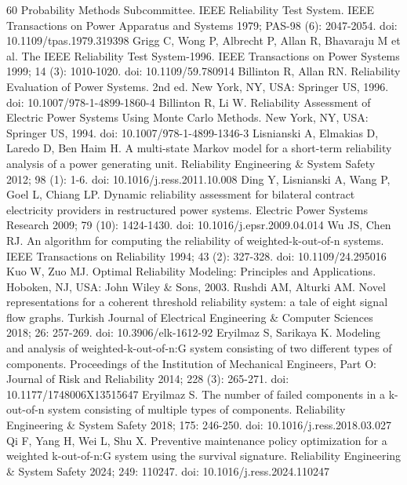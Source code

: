 \documentclass{elektr}
\begin{document}
\begin{thebibliography}{60}\footnotesize
\setlength{\itemsep}{0pt}
\setlength{\parsep}{0pt}
\setlength{\parskip}{0pt}
 Probability Methods Subcommittee. IEEE Reliability Test System. IEEE Transactions on Power Apparatus and Systems 1979; PAS-98 (6): 2047-2054. doi: 10.1109/tpas.1979.319398
 Grigg C, Wong P, Albrecht P, Allan R, Bhavaraju M et al. The IEEE Reliability Test System-1996. IEEE Transactions on Power Systems 1999; 14 (3): 1010-1020. doi: 10.1109/59.780914
 Billinton R, Allan RN. Reliability Evaluation of Power Systems. 2nd ed. New York, NY, USA: Springer US, 1996. doi: 10.1007/978-1-4899-1860-4
 Billinton R, Li W. Reliability Assessment of Electric Power Systems Using Monte Carlo Methods. New York, NY, USA: Springer US, 1994. doi: 10.1007/978-1-4899-1346-3
 Lisnianski A, Elmakias D, Laredo D, Ben Haim H. A multi-state Markov model for a short-term reliability analysis of a power generating unit. Reliability Engineering \& System Safety 2012; 98 (1): 1-6. doi: 10.1016/j.ress.2011.10.008
 Ding Y, Lisnianski A, Wang P, Goel L, Chiang LP. Dynamic reliability assessment for bilateral contract electricity providers in restructured power systems. Electric Power Systems Research 2009; 79 (10): 1424-1430. doi: 10.1016/j.epsr.2009.04.014
 Wu JS, Chen RJ. An algorithm for computing the reliability of weighted-k-out-of-n systems. IEEE Transactions on Reliability 1994; 43 (2): 327-328. doi: 10.1109/24.295016
 Kuo W, Zuo MJ. Optimal Reliability Modeling: Principles and Applications. Hoboken, NJ, USA: John Wiley \& Sons, 2003.
 Rushdi AM, Alturki AM. Novel representations for a coherent threshold reliability system: a tale of eight signal flow graphs. Turkish Journal of Electrical Engineering \& Computer Sciences 2018; 26: 257-269. doi: 10.3906/elk-1612-92
 Eryilmaz S, Sarikaya K. Modeling and analysis of weighted-k-out-of-n:G system consisting of two different types of components. Proceedings of the Institution of Mechanical Engineers, Part O: Journal of Risk and Reliability 2014; 228 (3): 265-271. doi: 10.1177/1748006X13515647
 Eryilmaz S. The number of failed components in a k-out-of-n system consisting of multiple types of components. Reliability Engineering \& System Safety 2018; 175: 246-250. doi: 10.1016/j.ress.2018.03.027
 Qi F, Yang H, Wei L, Shu X. Preventive maintenance policy optimization for a weighted k-out-of-n:G system using the survival signature. Reliability Engineering \& System Safety 2024; 249: 110247. doi: 10.1016/j.ress.2024.110247

\end{thebibliography}
\end{document}
